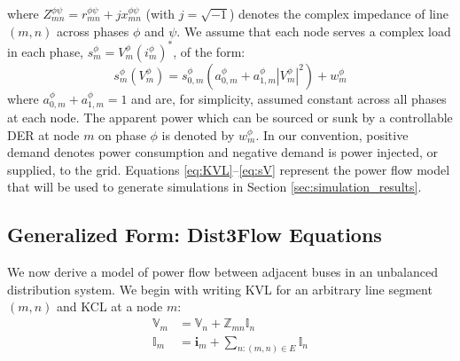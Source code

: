 where $Z^{\phi \psi}_{mn} = r^{\phi \psi}_{mn} + jx^{\phi \psi}_{mn}$ (with $j = \sqrt{-1}$) denotes the complex impedance of line $(m,n)$ across phases $\phi$ and $\psi$.
We assume that each node serves a complex load in each phase, $s_{m}^{\phi} = V_{m}^{\phi} {(i_{m}^{\phi})}^{*}$, of the form:
\begin{equation}
	s_{m}^{\phi} ( V_{m}^{\phi} ) = s_{0,m}^{\phi} \left(a_{0,m}^{\phi} + a_{1,m}^{\phi} | V_{m}^{\phi} |^2 \right) + w_{m}^{\phi}
    \label{eq:sV}
\end{equation}
\noindent where $a_{0,m}^{\phi} + a_{1,m}^{\phi} = 1$ and are, for simplicity, assumed constant across all phases at each node.  The apparent power which can be sourced or sunk by a controllable DER at node $m$ on phase $\phi$ is denoted by $w_{m}^{\phi}$. In our convention, positive demand denotes power consumption and negative demand is power injected, or supplied, to the grid.  Equations \eqref{eq:KVL}--\eqref{eq:sV} represent the power flow model that will be used to generate simulations in Section \ref{sec:simulation_results}. 

\subsection{Generalized Form: Dist3Flow Equations}

We now derive a model of power flow between adjacent buses in an unbalanced distribution system.  We begin with writing KVL for an arbitrary line segment $(m,n)$ and KCL at a node $m$:
\begin{align}
	\mathbb{V}_{m}  &= \mathbb{V}_{n} + \mathbb{Z}_{mn} \mathbb{I}_{n}
    \label{eq:KVL3}
    \\
    \mathbb{I}_{m} &= \mathbf{i}_{m} + \sum_{n:(m,n) \in E} \mathbb{I}_{n}
    \label{eq:KCL3}
\end{align}

